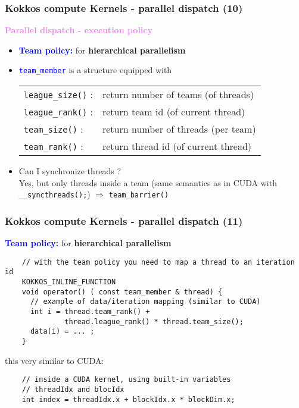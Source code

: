 \begin{frame}[fragile=singleslide]
  \frametitle{Kokkos compute Kernels - parallel dispatch (10)}

  {\Large \textcolor{violet}{\textbf{Parallel dispatch - execution policy}}}

  \begin{itemize}
  \item \textcolor{blue}{\bf Team policy:} for {\bf hierarchical parallelism}
  \item \textcolor{blue}{\texttt{team\_member}} is a structure equipped with
    \begin{tabular}{ll}
      \texttt{league\_size()} : & return number of teams (of threads)\\
      \texttt{league\_rank()} : & return team id (of current thread)\\
      \texttt{team\_size()}   : & return number of threads (per team)\\
      \texttt{team\_rank()} : & return thread id (of current thread)
    \end{tabular}
  \item Can I synchronize threads ?\\
    Yes, but only threads inside a team (same semantics as in CUDA with \texttt{\_\_syncthreads();})
    $\Rightarrow$ \texttt{team\_barrier()}
    
  \end{itemize}
  
\end{frame}
  
\begin{frame}[fragile=singleslide]
  \frametitle{Kokkos compute Kernels - parallel dispatch (11)}

  {\large \textcolor{blue}{\bf Team policy:} for {\bf hierarchical parallelism}}

  \begin{verbatim}
    // with the team policy you need to map a thread to an iteration id
    KOKKOS_INLINE_FUNCTION
    void operator() ( const team_member & thread) {
      // example of data/iteration mapping (similar to CUDA)
      int i = thread.team_rank() +
              thread.league_rank() * thread.team_size();
      data(i) = ... ;
    }
  \end{verbatim}
  this very similar to CUDA:
  \begin{verbatim}
    // inside a CUDA kernel, using built-in variables
    // threadIdx and blocIdx
    int index = threadIdx.x + blockIdx.x * blockDim.x;
  \end{verbatim}
  
\end{frame}
  
